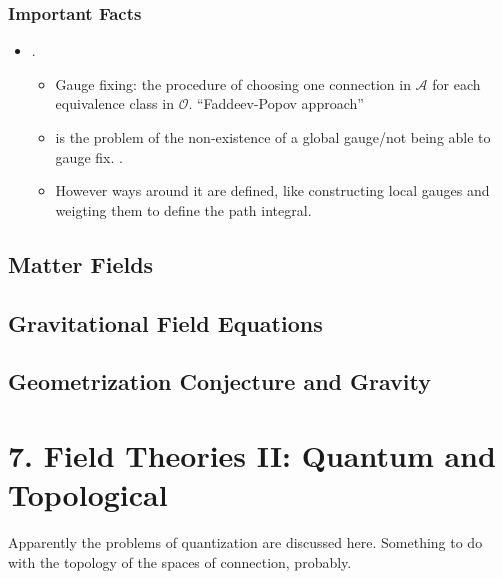 \documentclass[12pt]{report}
\begin{document}
\subsection{Important Facts}
\begin{itemize}
    \item {}.
    \begin{itemize}
        \item Gauge fixing: the procedure of choosing one connection in $\mathcal A$ for each equivalence class in $\mathcal O$. ``Faddeev-Popov approach''
        
        \item {} is the problem of the non-existence of a global gauge/not being able to gauge fix. .
        
        \item However ways around it are defined, like constructing local gauges and weigting them to define the path integral.
    \end{itemize}
\end{itemize}

\section{Matter Fields}

\section{Gravitational Field Equations}
\section{Geometrization Conjecture and Gravity}


\chapter*{7. Field Theories II: Quantum and Topological}

Apparently the problems of quantization are discussed here. Something to do with the topology of the spaces of connection, probably.
\end{document}
